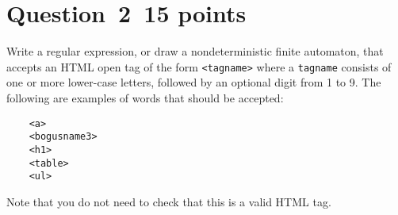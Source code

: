 \documentclass[10pt]{article}
\begin{document}
\section*{Question~2~\hfill 15 points}

Write a regular expression,
or draw a nondeterministic finite automaton,
that accepts an HTML open tag of the form
\verb|<tagname>|
where a \verb|tagname| consists
of one or more lower-case letters,
followed by an optional digit from 1 to 9.
The following are examples of words that should be accepted:
\begin{verbatim}
    <a>
    <bogusname3>
    <h1>
    <table>
    <ul>
\end{verbatim}
Note that you do not need to check that this is a valid HTML tag.
\end{document}
